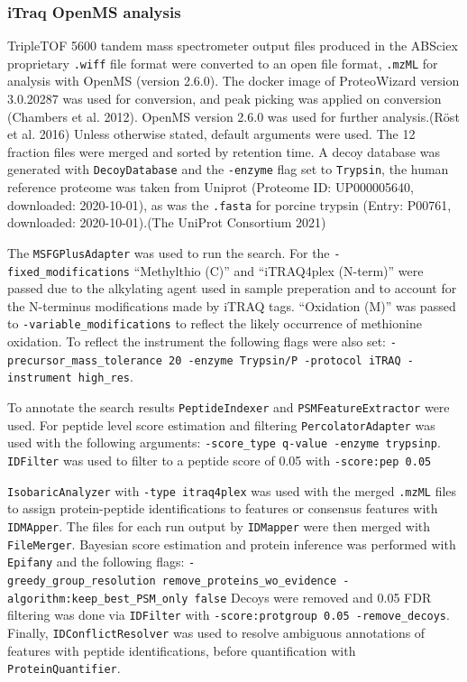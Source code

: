 \documentclass[9pt,lineno]{elife}
\begin{document}
\hypertarget{openms-chap3}{%
\subsubsection{iTraq OpenMS analysis}\label{openms-chap3}}

TripleTOF 5600 tandem mass spectrometer output files produced in the ABSciex proprietary \texttt{.wiff} file format were converted to an open file format, \texttt{.mzML} for analysis with OpenMS (version 2.6.0).
The docker image of ProteoWizard version 3.0.20287 was used for conversion, and peak picking was applied on conversion (Chambers et al. 2012).
OpenMS version 2.6.0 was used for further analysis.(Röst et al. 2016) Unless otherwise stated, default arguments were used.
The 12 fraction files were merged and sorted by retention time.
A decoy database was generated with \texttt{DecoyDatabase} and the \texttt{-enzyme} flag set to \texttt{Trypsin}, the human reference proteome was taken from Uniprot (Proteome ID: UP000005640, downloaded: 2020-10-01), as was the \texttt{.fasta} for porcine trypsin (Entry: P00761, downloaded: 2020-10-01).(The UniProt Consortium 2021)

The \texttt{MSFGPlusAdapter} was used to run the search.
For the \texttt{-fixed\_modifications} ``Methylthio (C)'' and ``iTRAQ4plex (N-term)'' were passed due to the alkylating agent used in sample preperation and to account for the N-terminus modifications made by iTRAQ tags.
``Oxidation (M)'' was passed to \texttt{-variable\_modifications} to reflect the likely occurrence of methionine oxidation.
To reflect the instrument the following flags were also set: \texttt{-precursor\_mass\_tolerance\ 20\ -enzyme\ Trypsin/P\ -protocol\ iTRAQ\ -instrument\ high\_res}.

To annotate the search results \texttt{PeptideIndexer} and \texttt{PSMFeatureExtractor} were used.
For peptide level score estimation and filtering \texttt{PercolatorAdapter} was used with the following arguments: \texttt{-score\_type\ q-value\ -enzyme\ trypsinp}.
\texttt{IDFilter} was used to filter to a peptide score of 0.05 with \texttt{-score:pep\ 0.05}

\texttt{IsobaricAnalyzer} with \texttt{-type\ itraq4plex} was used with the merged \texttt{.mzML} files to assign protein-peptide identifications to features or consensus features with \texttt{IDMApper}.
The files for each run output by \texttt{IDMapper} were then merged with \texttt{FileMerger}.
Bayesian score estimation and protein inference was performed with \texttt{Epifany} and the following flags: \texttt{-greedy\_group\_resolution\ remove\_proteins\_wo\_evidence\ -algorithm:keep\_best\_PSM\_only\ false} Decoys were removed and 0.05 FDR filtering was done via \texttt{IDFilter} with \texttt{-score:protgroup\ 0.05\ -remove\_decoys}.
Finally, \texttt{IDConflictResolver} was used to resolve ambiguous annotations of features with peptide identifications, before quantification with \texttt{ProteinQuantifier}.
\end{document}
